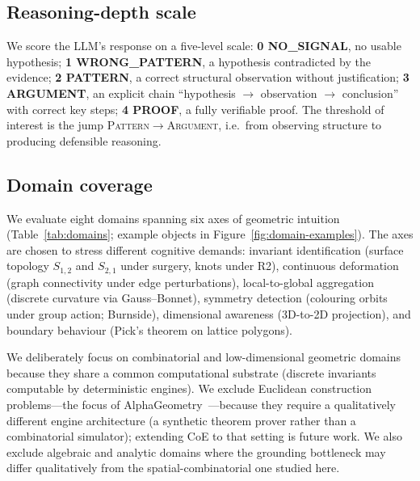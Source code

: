 \documentclass{article}
\begin{document}
\subsection{Reasoning-depth scale}
We score the LLM's response on a five-level scale:
\textbf{0 NO\_SIGNAL}, no usable hypothesis;
\textbf{1 WRONG\_PATTERN}, a hypothesis contradicted by the evidence;
\textbf{2 PATTERN}, a correct structural observation without justification;
\textbf{3 ARGUMENT}, an explicit chain ``hypothesis $\to$ observation $\to$ conclusion'' with
correct key steps;
\textbf{4 PROOF}, a fully verifiable proof. The threshold of interest is the jump
\textsc{Pattern}$\to$\textsc{Argument}, i.e.~from observing structure to producing
defensible reasoning.

\subsection{Domain coverage}
We evaluate eight domains spanning six axes of geometric intuition
(Table~\ref{tab:domains}; example objects in Figure~\ref{fig:domain-examples}). The
axes are chosen to stress different cognitive demands: invariant identification
(surface topology $S_{1,2}$ and $S_{2,1}$ under surgery, knots under R2), continuous
deformation (graph connectivity under edge perturbations), local-to-global
aggregation (discrete curvature via Gauss--Bonnet), symmetry detection (colouring
orbits under group action; Burnside), dimensional awareness (3D-to-2D projection),
and boundary behaviour (Pick's theorem on lattice polygons).

We deliberately focus on combinatorial and low-dimensional geometric domains
because they share a common computational substrate (discrete invariants
computable by deterministic engines). We exclude Euclidean construction
problems---the focus of AlphaGeometry~\citep{trinh2024alphageometry}---because
they require a qualitatively different engine architecture (a synthetic theorem
prover rather than a combinatorial simulator); extending CoE to that setting is
future work. We also exclude algebraic and analytic domains where the grounding
bottleneck may differ qualitatively from the spatial-combinatorial one studied
here.
\end{document}
